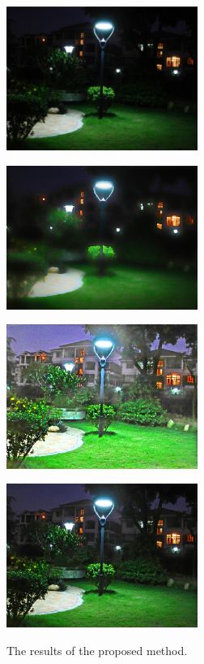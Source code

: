 \begin{figure}[tb]
\centering
	\begin{minipage}[b]{0.49\hsize}
		\centering
		\includegraphics[width=62.5mm]{images/proposed/input.eps}
		 \label{fig:proposed/input}
	\end{minipage}
	\begin{minipage}[b]{0.49\hsize}
		\centering
		\includegraphics[width=62.5mm]{images/proposed/illumination.eps}
		 \label{fig:proposed/illumination}
	\end{minipage}
	\begin{minipage}[b]{0.49\hsize}
		\centering
		\includegraphics[width=62.5mm]{images/proposed/reflectance.eps}
		 \label{fig:proposed/reflectance}
	\end{minipage}
	\begin{minipage}[b]{0.49\hsize}
		\centering
		\includegraphics[width=62.5mm]{images/proposed/output.eps}
		 \label{fig:proposed/enhanced}
	\end{minipage}
	\caption{The results of the proposed method.}
	\label{fig:proposed/output}
\end{figure}